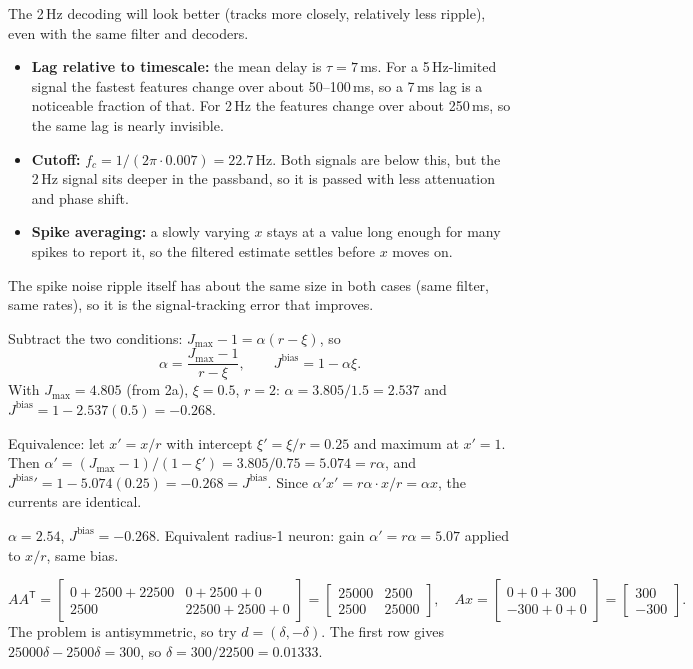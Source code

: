 \documentclass[10pt,letterpaper]{article}
\newcommand{\T}{\mathsf{T}}
\newcommand{\Jb}{J^{\mathrm{bias}}}
\newcommand{\qsec}[1]{\vspace{8pt}{\large\bfseries #1}\par\vspace{2pt}}
\newcommand{\ans}[1]{\par\vspace{3pt}{\bfseries #1}\quad}
\begin{document}
\ans{5e.}
The 2\,Hz decoding will look better (tracks more closely, relatively less ripple), even with the same filter and decoders.
\begin{itemize}[leftmargin=1.5em,itemsep=1pt]
\item \textbf{Lag relative to timescale:} the mean delay is $\tau = 7$\,ms. For a 5\,Hz-limited signal the fastest features change over about 50--100\,ms, so a 7\,ms lag is a noticeable fraction of that. For 2\,Hz the features change over about 250\,ms, so the same lag is nearly invisible.
\item \textbf{Cutoff:} $f_c = 1/(2\pi\cdot 0.007) = 22.7$\,Hz. Both signals are below this, but the 2\,Hz signal sits deeper in the passband, so it is passed with less attenuation and phase shift.
\item \textbf{Spike averaging:} a slowly varying $x$ stays at a value long enough for many spikes to report it, so the filtered estimate settles before $x$ moves on.
\end{itemize}
The spike noise ripple itself has about the same size in both cases (same filter, same rates), so it is the signal-tracking error that improves.

\qsec{6. Population decoding of a time-varying signal}

\ans{6a.}
Subtract the two conditions: $J_{\max} - 1 = \alpha(r - \xi)$, so
\[
\alpha = \frac{J_{\max} - 1}{r - \xi},\qquad \Jb = 1 - \alpha\xi.
\]
With $J_{\max} = 4.805$ (from 2a), $\xi = 0.5$, $r = 2$: $\alpha = 3.805/1.5 = 2.537$ and $\Jb = 1 - 2.537(0.5) = -0.268$.

Equivalence: let $x' = x/r$ with intercept $\xi' = \xi/r = 0.25$ and maximum at $x' = 1$. Then $\alpha' = (J_{\max} - 1)/(1 - \xi') = 3.805/0.75 = 5.074 = r\alpha$, and $\Jb{}' = 1 - 5.074(0.25) = -0.268 = \Jb$. Since $\alpha' x' = r\alpha \cdot x/r = \alpha x$, the currents are identical.
\begin{result}
$\alpha = 2.54$, $\Jb = -0.268$. Equivalent radius-1 neuron: gain $\alpha' = r\alpha = 5.07$ applied to $x/r$, same bias.
\end{result}

\ans{6b.}
\[
AA^\T = \begin{bmatrix} 0 + 2500 + 22500 & 0 + 2500 + 0 \\ 2500 & 22500 + 2500 + 0\end{bmatrix} = \begin{bmatrix} 25000 & 2500 \\ 2500 & 25000\end{bmatrix},\quad
Ax = \begin{bmatrix} 0 + 0 + 300 \\ -300 + 0 + 0\end{bmatrix} = \begin{bmatrix} 300 \\ -300\end{bmatrix}.
\]
The problem is antisymmetric, so try $d = (\delta, -\delta)$. The first row gives $25000\delta - 2500\delta = 300$, so $\delta = 300/22500 = 0.01333$.
\end{document}
